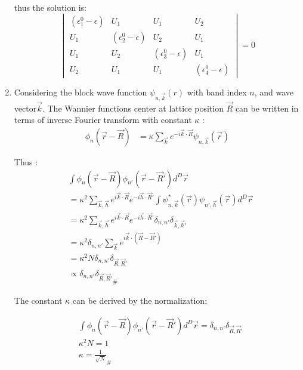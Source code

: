 \documentclass[notitlepage]{revtex4-1}
\begin{document}
\begin{CJK}{UTF8}{bsmi}
\begin{enumerate}
	thus the solution is:
	\begin{equation}
		\begin{vmatrix}
			( \epsilon^{0}_1 - \epsilon ) & U_1 & U_1 & U_2 \\
			U_1 & ( \epsilon^{0}_2 - \epsilon ) & U_2 & U_1 \\
			U_1 & U_2 &( \epsilon^{0}_3 - \epsilon ) &  U_1 \\
			U_2 & U_1 & U_1 &( \epsilon^{0}_4 - \epsilon )  
		\end{vmatrix} = 0
	\end{equation}
	    
	
	\item Considering the block wave function $\psi_{n,\vec{k}}(r)$ with band index $n$, and wave vector$\vec{k}$. The Wannier functions center at lattice position $\vec{R}$ can be written in terms of inverse Fourier transform with constant $\kappa$ :
	\begin{equation}
		\begin{split}
			\phi_n(\vec{r} - \vec{R}) &= \kappa \sum_{\vec{k}} e^{-i \vec{k} \cdot \vec{R}} \psi_{n,\vec{k}}(\vec{r}) 
		\end{split}
	\end{equation}   
	
	Thus :
	\begin{equation}
		\begin{split}
			& \int \phi_n(\vec{r} - \vec{R})\phi_{n'}(\vec{r} - \vec{R}')  d^{D}\vec{r} \\
			&= \kappa^2 \sum_{\vec{k},\vec{h}} e^{i \vec{k} \cdot \vec{R}} e^{-i \vec{h} \cdot \vec{R}'} \int \psi^{*}_{n,\vec{k}}(\vec{r})\psi_{n',\vec{h}}(\vec{r}) d^{D}\vec{r} \\
			&= \kappa^2 \sum_{\vec{k},\vec{h}} e^{i \vec{k} \cdot \vec{R}} e^{-i \vec{h} \cdot \vec{R}'} \delta_{n,n'} \delta_{\vec{k},\vec{h}'} \\
			&= \kappa^2 \delta_{n,n'} \sum_{\vec{k}} e^{i \vec{k} \cdot (\vec{R}-\vec{R}')} \\
			&= \kappa^2 N \delta_{n,n'} \delta_{\vec{R},\vec{R}'} \\
			&\propto \delta_{n,n'} {\delta_{\vec{R},\vec{R}'}}_{\#}
		\end{split}
	\end{equation} 	
	
	The constant $\kappa$ can be derived by the normalization:
	
	\begin{align*}
	 &\int \phi_n(\vec{r} - \vec{R})\phi_{n'}(\vec{r} - \vec{R}') d^{D}\vec{r} = \delta_{n,n'} \delta_{\vec{R},\vec{R}'} \\
	 &\kappa^2 N = 1 \\
	 &\kappa = \frac{1}{\sqrt{N}}_{\#}
	\end{align*}


\end{enumerate}
\end{CJK}
\end{document}
